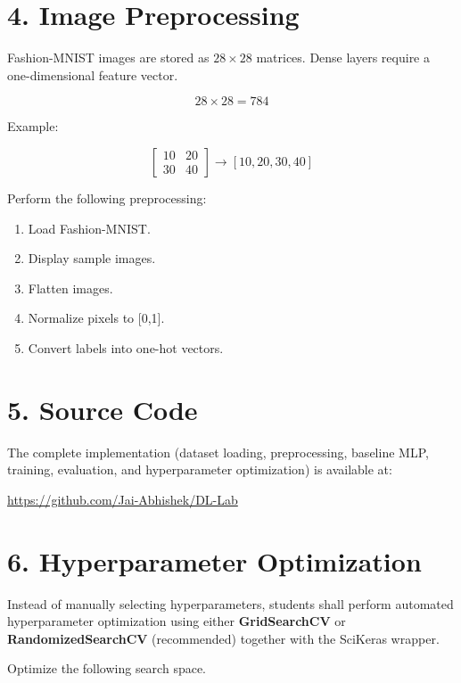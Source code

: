 \documentclass[11pt]{article}
\begin{document}
\section*{4. Image Preprocessing}

Fashion-MNIST images are stored as $28\times28$ matrices. Dense layers require a one-dimensional feature vector.

\[
28\times28=784
\]

Example:

\[
\begin{bmatrix}
10&20\\30&40
\end{bmatrix}
\rightarrow
[10,20,30,40]
\]

Perform the following preprocessing:

\begin{enumerate}
\item Load Fashion-MNIST.
\item Display sample images.
\item Flatten images.
\item Normalize pixels to [0,1].
\item Convert labels into one-hot vectors.
\end{enumerate}

\section*{5. Source Code}

The complete implementation (dataset loading, preprocessing, baseline MLP, training, evaluation, and hyperparameter optimization) is available at:

\begin{center}
\url{https://github.com/Jai-Abhishek/DL-Lab}
\end{center}

\section*{6. Hyperparameter Optimization}

Instead of manually selecting hyperparameters, students shall perform automated hyperparameter optimization using either \textbf{GridSearchCV} or \textbf{RandomizedSearchCV} (recommended) together with the SciKeras wrapper.

Optimize the following search space.
\end{document}
